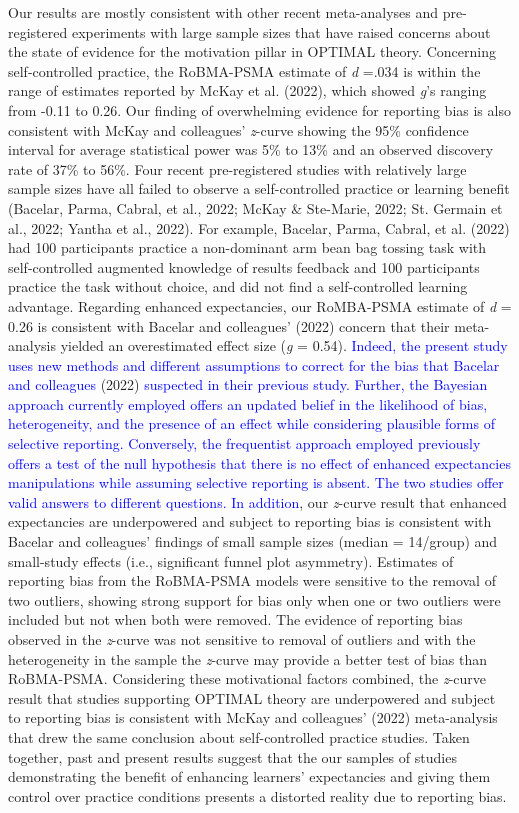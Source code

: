 \documentclass[
  man, donotrepeattitle,mask,floatsintext]{apa7}
\begin{document}
Our results are mostly consistent with other recent meta-analyses and pre-registered experiments with large sample sizes that have raised concerns about the state of evidence for the motivation pillar in OPTIMAL theory. Concerning self-controlled practice, the RoBMA-PSMA estimate of \emph{d} =.034 is within the range of estimates reported by McKay et al. (2022), which showed \emph{g}'s ranging from -0.11 to 0.26. Our finding of overwhelming evidence for reporting bias is also consistent with McKay and colleagues' \emph{z}-curve showing the 95\% confidence interval for average statistical power was 5\% to 13\% and an observed discovery rate of 37\% to 56\%. Four recent pre-registered studies with relatively large sample sizes have all failed to observe a self-controlled practice or learning benefit (Bacelar, Parma, Cabral, et al., 2022; McKay \& Ste-Marie, 2022; St. Germain et al., 2022; Yantha et al., 2022). For example, Bacelar, Parma, Cabral, et al. (2022) had 100 participants practice a non-dominant arm bean bag tossing task with self-controlled augmented knowledge of results feedback and 100 participants practice the task without choice, and did not find a self-controlled learning advantage. Regarding enhanced expectancies, our RoMBA-PSMA estimate of \emph{d} = 0.26 is consistent with Bacelar and colleagues' (2022) concern that their meta-analysis yielded an overestimated effect size (\emph{g} = 0.54). \textcolor{blue}{Indeed, the present study uses new methods and different assumptions to correct for the bias that Bacelar and colleagues} (2022) \textcolor{blue}{ suspected in their previous study. Further, the Bayesian approach currently employed offers an updated belief in the likelihood of bias, heterogeneity, and the presence of an effect while considering plausible forms of selective reporting. Conversely, the frequentist approach employed previously offers a test of the null hypothesis that there is no effect of enhanced expectancies manipulations while assuming selective reporting is absent. The two studies offer valid answers to different questions. In addition}, our \emph{z}-curve result that enhanced expectancies are underpowered and subject to reporting bias is consistent with Bacelar and colleagues' findings of small sample sizes (median = 14/group) and small-study effects (i.e., significant funnel plot asymmetry). Estimates of reporting bias from the RoBMA-PSMA models were sensitive to the removal of two outliers, showing strong support for bias only when one or two outliers were included but not when both were removed. The evidence of reporting bias observed in the \emph{z}-curve was not sensitive to removal of outliers and with the heterogeneity in the sample the \emph{z}-curve may provide a better test of bias than RoBMA-PSMA. Considering these motivational factors combined, the \emph{z}-curve result that studies supporting OPTIMAL theory are underpowered and subject to reporting bias is consistent with McKay and colleagues' (2022) meta-analysis that drew the same conclusion about self-controlled practice studies. Taken together, past and present results suggest that the our samples of studies demonstrating the benefit of enhancing learners' expectancies and giving them control over practice conditions presents a distorted reality due to reporting bias. 
\end{document}
